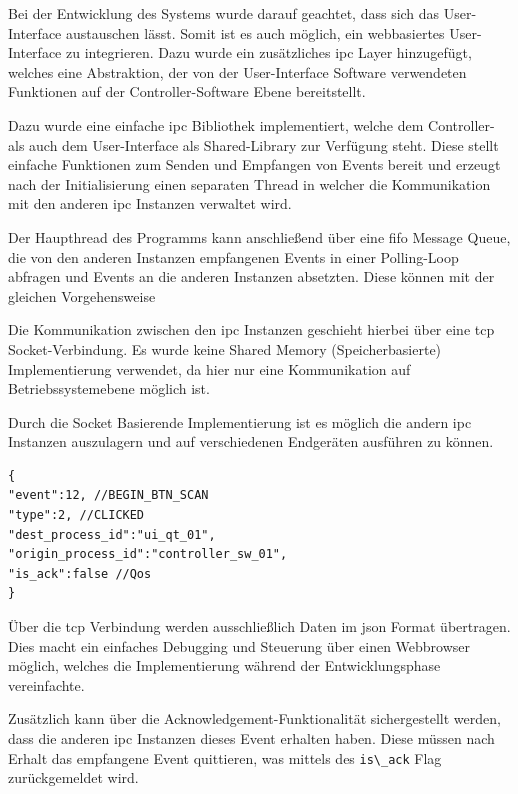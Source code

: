 Bei der Entwicklung des Systems wurde darauf geachtet, dass sich das
User-Interface austauschen lässt. Somit ist es auch möglich, ein
webbasiertes User-Interface zu integrieren. Dazu wurde ein zusätzliches
\gls{ipc} Layer hinzugefügt, welches eine Abstraktion, der von der
User-Interface Software verwendeten Funktionen auf der
Controller-Software Ebene bereitstellt.

Dazu wurde eine einfache \gls{ipc} Bibliothek implementiert, welche dem
Controller- als auch dem User-Interface als Shared-Library zur Verfügung
steht. Diese stellt einfache Funktionen zum Senden und Empfangen von
Events bereit und erzeugt nach der Initialisierung einen separaten
Thread in welcher die Kommunikation mit den anderen \gls{ipc} Instanzen
verwaltet wird.

Der Haupthread des Programms kann anschließend über eine \gls{fifo}
Message Queue, die von den anderen Instanzen empfangenen Events in einer
Polling-Loop abfragen und Events an die anderen Instanzen absetzten.
Diese können mit der gleichen Vorgehensweise

Die Kommunikation zwischen den \gls{ipc} Instanzen geschieht hierbei
über eine \gls{tcp} Socket-Verbindung. Es wurde keine Shared Memory
(Speicherbasierte) Implementierung verwendet, da hier nur eine
Kommunikation auf Betriebssystemebene möglich ist.

Durch die Socket Basierende Implementierung ist es möglich die andern
\gls{ipc} Instanzen auszulagern und auf verschiedenen Endgeräten
ausführen zu können.

\begin{lstlisting}
{
"event":12, //BEGIN_BTN_SCAN
"type":2, //CLICKED
"dest_process_id":"ui_qt_01",
"origin_process_id":"controller_sw_01",
"is_ack":false //Qos
}
\end{lstlisting}

Über die \gls{tcp} Verbindung werden ausschließlich Daten im \gls{json}
Format übertragen. Dies macht ein einfaches Debugging und Steuerung über
einen Webbrowser möglich, welches die Implementierung während der
Entwicklungsphase vereinfachte.

Zusätzlich kann über die Acknowledgement-Funktionalität sichergestellt
werden, dass die anderen \gls{ipc} Instanzen dieses Event erhalten
haben. Diese müssen nach Erhalt das empfangene Event quittieren, was
mittels des \passthrough{\lstinline!is\_ack!} Flag zurückgemeldet wird.

